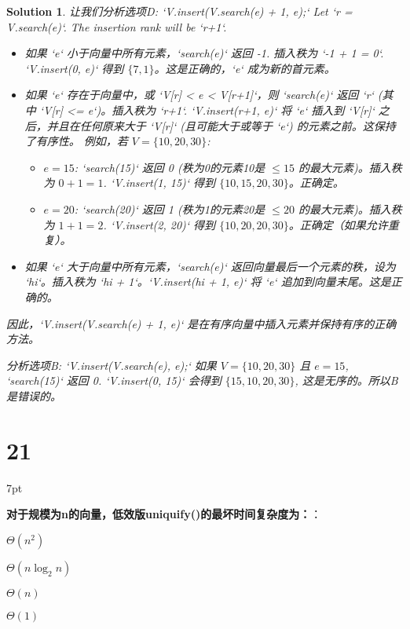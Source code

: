 \documentclass[UTF8]{report}
\newtheorem{solution}{Solution}
\theoremstyle{MyLineTheoremStyle} %
\theoremstyle{MyBlockTheoremStyle} %
\theoremstyle{MySubsubsectionStyle} %
\newenvironment{graybox}{%
        \def\FrameCommand{%
        \hspace{1pt}%
        {\color{gray}\small \vrule width 2pt}%
        {\color{graybox_color}\vrule width 4pt}%
        \colorbox{graybox_color}%
        }%
        \MakeFramed{\advance\hsize-\width\FrameRestore}%
        \noindent\hspace{-4.55pt}%
        \begin{adjustwidth}{}{7pt}%
        \vspace{2pt}\vspace{2pt}%
        }
        {%
        \vspace{2pt}\end{adjustwidth}\endMakeFramed%
        }
\begin{document}
\begin{solution}
让我们分析选项D: `V.insert(V.search(e) + 1, e);`
Let `r = V.search(e)`. The insertion rank will be `r+1`.
\begin{itemize}
    \item 如果 `e` 小于向量中所有元素，`search(e)` 返回 -1. 插入秩为 `-1 + 1 = 0`. `V.insert(0, e)` 得到 $\{7, 1\}$。这是正确的，`e` 成为新的首元素。
    \item 如果 `e` 存在于向量中，或 `V[r] < e < V[r+1]`，则 `search(e)` 返回 `r` (其中 `V[r] <= e`)。插入秩为 `r+1`. `V.insert(r+1, e)` 将 `e` 插入到 `V[r]` 之后，并且在任何原来大于 `V[r]` (且可能大于或等于 `e`) 的元素之前。这保持了有序性。
    例如，若 $V=\{10, 20, 30\}$:
    \begin{itemize}
        \item $e=15$: `search(15)` 返回 0 (秩为0的元素10是 $\le 15$ 的最大元素)。插入秩为 $0+1=1$. `V.insert(1, 15)` 得到 $\{10, 15, 20, 30\}$。正确定。
        \item $e=20$: `search(20)` 返回 1 (秩为1的元素20是 $\le 20$ 的最大元素)。插入秩为 $1+1=2$. `V.insert(2, 20)` 得到 $\{10, 20, 20, 30\}$。正确定（如果允许重复）。
    \end{itemize}
    \item 如果 `e` 大于向量中所有元素，`search(e)` 返回向量最后一个元素的秩，设为 `hi`。插入秩为 `hi + 1`。`V.insert(hi + 1, e)` 将 `e` 追加到向量末尾。这是正确的。
\end{itemize}

因此，`V.insert(V.search(e) + 1, e)` 是在有序向量中插入元素并保持有序的正确方法。

分析选项B: `V.insert(V.search(e), e);`
如果 $V=\{10, 20, 30\}$ 且 $e=15$, `search(15)` 返回 0. `V.insert(0, 15)` 会得到 $\{15, 10, 20, 30\}$, 这是无序的。所以B是错误的。
\end{solution}


\section*{21}

\begin{graybox}
\textbf{对于规模为n的向量，低效版uniquify()的最坏时间复杂度为：}：
\begin{circledenum}
    \item $\Theta(n^2)$
    \item $\Theta(n\log_{2}n)$
    \item $\Theta(n)$
    \item $\Theta(1)$
\end{circledenum}
\end{graybox}
\end{document}
